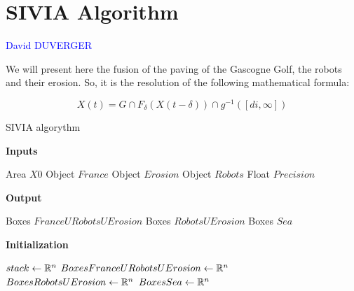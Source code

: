 
\section{SIVIA Algorithm}

\vspace{0.3 cm}
	
	\textcolor{blue} {David DUVERGER}
	
	\vspace{0.5 cm}
	
	We will present here the fusion of the paving of the Gascogne Golf, the robots and their erosion. So, it is the resolution of the following mathematical formula:
	
	$$X(t) = G \cap F_{\delta}(X(t-\delta)) \cap g^{-1}([di,\infty])$$
	

\begin{algorithm}
  \caption{SIVIA algorythm}
  \vspace{0.5 cm}
  \textbf{Inputs}%
  \begin{algorithmic}[1]
    \STATE Area $X0$
    \STATE Object $France$
    \STATE Object $Erosion$
    \STATE Object $Robots$
    \STATE Float $Precision$
  \end{algorithmic}
  \bigskip

  \textbf{Output}%
  \begin{algorithmic}[1]

    \STATE Boxes $France U Robots U Erosion$
    \STATE Boxes $Robots U Erosion$
    \STATE Boxes $Sea$
  \end{algorithmic}
  \bigskip
  
  \textbf{Initialization}%
  \begin{algorithmic}[1]
   	\STATE $stack\gets \mathbb{R^{\textnormal{\ensuremath{n}}}}$
	\STATE $BoxesFranceURobotsUErosion\gets \mathbb{R^{\textnormal{\ensuremath{n}}}}$
	\STATE $BoxesRobotsUErosion\gets \mathbb{R^{\textnormal{\ensuremath{n}}}}$
	\STATE $BoxesSea\gets \mathbb{R^{\textnormal{\ensuremath{n}}}}$
  \end{algorithmic}
  
\end{algorithm}




\newpage


